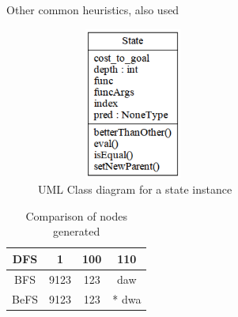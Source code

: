 \documentclass[journal]{IEEEtran}
\begin{document}
Other common heuristics, also used




\begin{figure}[Hb]
\centering
\includegraphics[height=5cm,keepaspectratio,width=2.5in]{fig/state.png}%
\caption{UML Class diagram for a state instance}
\label{fig:UMLstate}
\end{figure}


%

%
\begin{table}[!t]
\renewcommand{\arraystretch}{1.3}
\caption{Comparison of nodes generated}
\label{table_example}
\centering
\begin{tabular}{|c|ccc|}
\hline
DFS & 1 & 100 & 110 \\
\hline
BFS & 9123 & 123 & daw \\
\hline
BeFS & 9123 & 123 &* dwa \\
\hline
\end{tabular}
\end{table}
\end{document}

